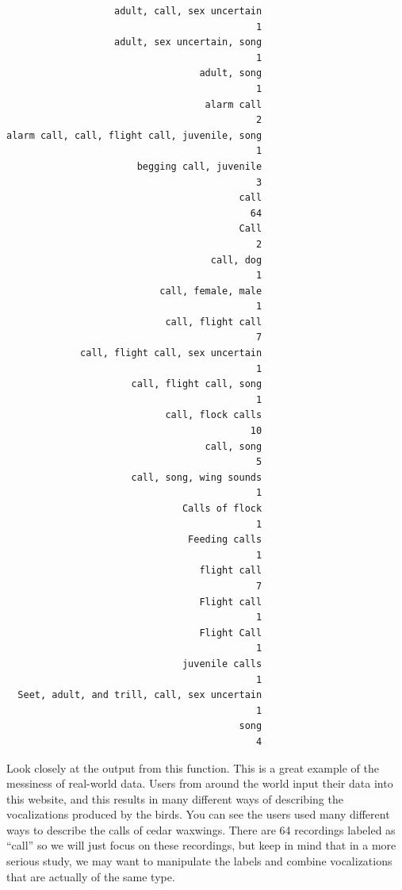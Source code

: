 \documentclass[
]{krantz}
\begin{document}
\begin{verbatim}
                   adult, call, sex uncertain 
                                            1 
                   adult, sex uncertain, song 
                                            1 
                                  adult, song 
                                            1 
                                   alarm call 
                                            2 
alarm call, call, flight call, juvenile, song 
                                            1 
                       begging call, juvenile 
                                            3 
                                         call 
                                           64 
                                         Call 
                                            2 
                                    call, dog 
                                            1 
                           call, female, male 
                                            1 
                            call, flight call 
                                            7 
             call, flight call, sex uncertain 
                                            1 
                      call, flight call, song 
                                            1 
                            call, flock calls 
                                           10 
                                   call, song 
                                            5 
                      call, song, wing sounds 
                                            1 
                               Calls of flock 
                                            1 
                                Feeding calls 
                                            1 
                                  flight call 
                                            7 
                                  Flight call 
                                            1 
                                  Flight Call 
                                            1 
                               juvenile calls 
                                            1 
  Seet, adult, and trill, call, sex uncertain 
                                            1 
                                         song 
                                            4 
\end{verbatim}

Look closely at the output from this function. This is a great example of the messiness of real-world data. Users from around the world input their data into this website, and this results in many different ways of describing the vocalizations produced by the birds. You can see the users used many different ways to describe the calls of cedar waxwings. There are 64 recordings labeled as ``call'' so we will just focus on these recordings, but keep in mind that in a more serious study, we may want to manipulate the labels and combine vocalizations that are actually of the same type.
\end{document}
